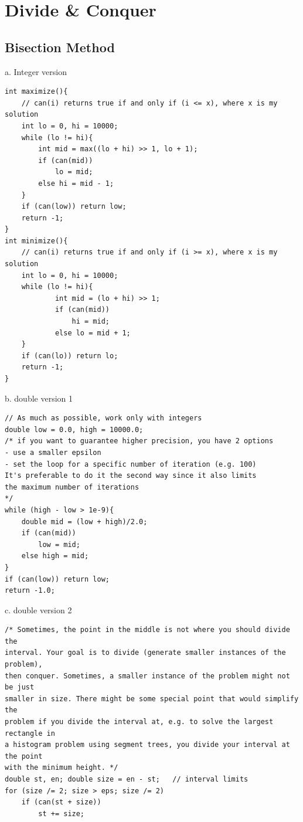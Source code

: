 \documentclass[12pt]{book}
\begin{document}
\chapter{Divide \& Conquer}
\section{Bisection Method}
a. Integer version
\begin{verbatim}
int maximize(){
	// can(i) returns true if and only if (i <= x), where x is my solution
	int lo = 0, hi = 10000;
	while (lo != hi){
		int mid = max((lo + hi) >> 1, lo + 1);
		if (can(mid))
			lo = mid;
		else hi = mid - 1;
	}
	if (can(low)) return low;
	return -1;
}
int minimize(){
	// can(i) returns true if and only if (i >= x), where x is my solution
	int lo = 0, hi = 10000;
	while (lo != hi){
			int mid = (lo + hi) >> 1;
			if (can(mid))
				hi = mid;
			else lo = mid + 1;
	}
	if (can(lo)) return lo;
	return -1;
}
\end{verbatim}
b. double version 1
\begin{verbatim}
// As much as possible, work only with integers
double low = 0.0, high = 10000.0;
/* if you want to guarantee higher precision, you have 2 options
- use a smaller epsilon 
- set the loop for a specific number of iteration (e.g. 100)
It's preferable to do it the second way since it also limits
the maximum number of iterations
*/
while (high - low > 1e-9){
	double mid = (low + high)/2.0;
	if (can(mid))
		low = mid;
	else high = mid;
}
if (can(low)) return low;
return -1.0;
\end{verbatim}
c. double version 2
\begin{verbatim}
/* Sometimes, the point in the middle is not where you should divide the
interval. Your goal is to divide (generate smaller instances of the problem),
then conquer. Sometimes, a smaller instance of the problem might not be just
smaller in size. There might be some special point that would simplify the
problem if you divide the interval at, e.g. to solve the largest rectangle in
a histogram problem using segment trees, you divide your interval at the point
with the minimum height. */
double st, en; double size = en - st;	// interval limits
for (size /= 2; size > eps; size /= 2)
	if (can(st + size))
		st += size;
\end{verbatim}
\end{document}
